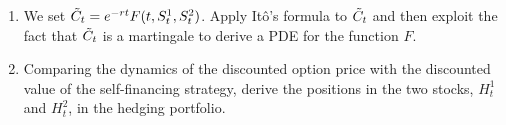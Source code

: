\documentclass[11pt,a4,table]{article}
\begin{document}
\begin{enumerate}
\begin{enumerate}
        \item We set $\Tilde{C}_t = e^{-rt}F(t,S_t^1, S_t^2)$. Apply Itô's formula to $\Tilde{C}_t$ and then exploit the fact that $\Tilde{C}_t$ is a martingale to derive a PDE for the function $F$.
        
        \item Comparing the dynamics of the discounted option price with the discounted value of the self-financing strategy, derive the positions in the two stocks, $H_t^1$ and $H_t^2$, in the hedging portfolio.
    \end{enumerate}
    
    
\end{enumerate}
\end{document}
